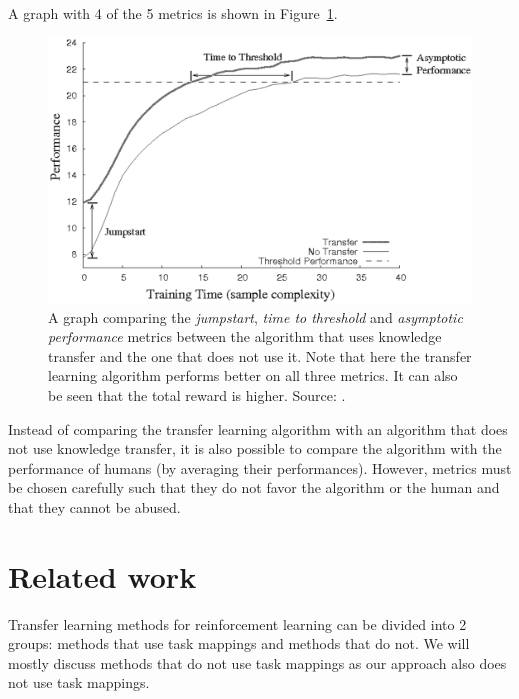 A graph with 4 of the 5 metrics is shown in Figure~\ref{fig:TLmetrics}.
\begin{figure}[htb]
    \centering
    \includegraphics[width=.9\linewidth]{images/tlmetrics.png}
    \caption[Transfer learning metrics]{A graph comparing the \textit{jumpstart}, \textit{time to threshold} and \textit{asymptotic performance} metrics between the algorithm that uses knowledge transfer and the one that does not use it. Note that here the transfer learning algorithm performs better on all three metrics. It can also be seen that the total reward is higher. Source: \cite{Taylor2009TransferSurvey}.}
    \label{fig:TLmetrics}
\end{figure}
Instead of comparing the transfer learning algorithm with an algorithm that does not use knowledge transfer, it is also possible to compare the algorithm with the performance of humans (by averaging their performances).
However, metrics must be chosen carefully such that they do not favor the algorithm or the human and that they cannot be abused.

\section{Related work}




Transfer learning methods for reinforcement learning can be divided into 2 groups: methods that use task mappings and methods that do not.
We will mostly discuss methods that do not use task mappings as our approach also does not use task mappings.\\

